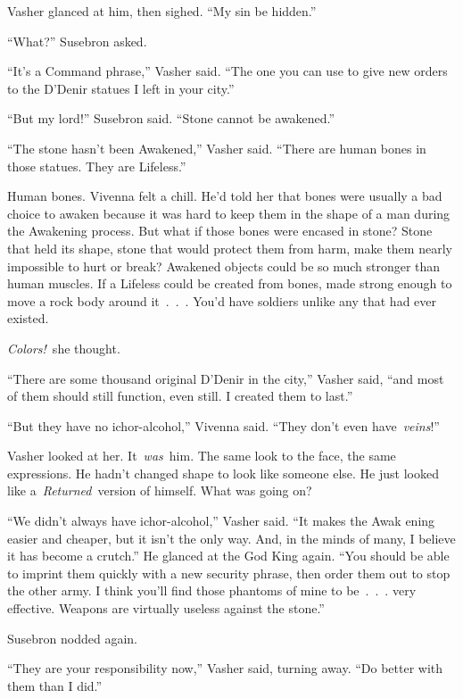 Vasher glanced at him, then sighed. “My sin be hidden.”

“What?” Susebron asked.

“It’s a Command phrase,” Vasher said. “The one you can use to give new orders to the D’Denir statues I left in your city.”

“But my lord!” Susebron said. “Stone cannot be awakened.”

“The stone hasn’t been Awakened,” Vasher said. “There are human bones in those statues. They are Lifeless.”

Human bones. Vivenna felt a chill. He’d told her that bones were usually a bad choice to awaken because it was hard to keep them in the shape of a man during the Awakening process. But what if those bones were encased in stone? Stone that held its shape, stone that would protect them from harm, make them nearly impossible to hurt or break? Awakened objects could be so much stronger than human muscles. If a Lifeless could be created from bones, made strong enough to move a rock body around it~.~.~. You’d have soldiers unlike any that had ever existed.

\textit{Colors!}~she thought.

“There are some thousand original D’Denir in the city,” Vasher said, “and most of them should still function, even still. I created them to last.”

“But they have no ichor-alcohol,” Vivenna said. “They don’t even have~\textit{veins}!”

Vasher looked at her. It~\textit{was}~him. The same look to the face, the same expressions. He hadn’t changed shape to look like someone else. He just looked like a~\textit{Returned}~version of himself. What was going on?

“We didn’t always have ichor-alcohol,” Vasher said. “It makes the Awak ening easier and cheaper, but it isn’t the only way. And, in the minds of many, I believe it has become a crutch.” He glanced at the God King again. “You should be able to imprint them quickly with a new security phrase, then order them out to stop the other army. I think you’ll find those phantoms of mine to be~.~.~. very effective. Weapons are virtually useless against the stone.”

Susebron nodded again.

“They are your responsibility now,” Vasher said, turning away. “Do better with them than I did.”

